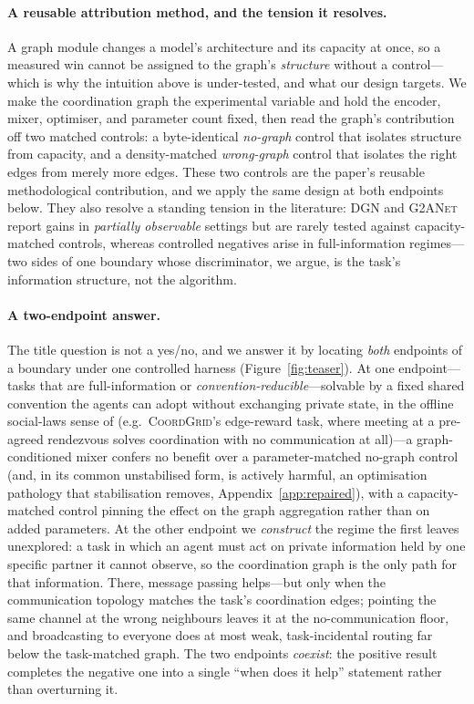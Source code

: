 \documentclass[10pt]{article}
\newcommand{\algoname}[1]{\textsc{#1}}
\newcommand{\coordgrid}{\textsc{CoordGrid}}
\begin{document}
\paragraph{A reusable attribution method, and the tension it resolves.} A graph
module changes a model's architecture and its capacity at once, so a measured
win cannot be assigned to the graph's \emph{structure} without a control---which
is why the intuition above is under-tested, and what our design targets. We make
the coordination graph the experimental variable and hold the encoder, mixer,
optimiser, and parameter count fixed, then read the graph's contribution off two
matched controls: a byte-identical \emph{no-graph} control that isolates
structure from capacity, and a density-matched \emph{wrong-graph} control that
isolates the right edges from merely more edges. These two controls are the
paper's reusable methodological contribution, and we apply the same design at
both endpoints below. They also resolve a standing tension in the literature:
\algoname{DGN} and \algoname{G2ANet} report gains in \emph{partially observable}
settings but are rarely tested against capacity-matched controls, whereas
controlled negatives arise in full-information regimes---two sides of one
boundary whose discriminator, we argue, is the task's information structure, not
the algorithm.

\paragraph{A two-endpoint answer.} The title question is not a yes/no, and we
answer it by locating \emph{both} endpoints of a boundary under one
controlled harness (Figure~\ref{fig:teaser}). At one endpoint---tasks that
are full-information or
\emph{convention-reducible}---solvable by a fixed shared
convention the agents can adopt without exchanging private state, in the
offline social-laws sense of \citet{shoham_1995_sociallaws} (e.g.\
\coordgrid's edge-reward task, where meeting at a pre-agreed rendezvous
solves coordination with no communication at all)---a graph-conditioned
mixer confers no benefit over a parameter-matched no-graph control (and, in
its common unstabilised form, is actively harmful, an optimisation pathology
that stabilisation removes, Appendix~\ref{app:repaired}), with a
capacity-matched control pinning the effect on the graph
aggregation rather than on added parameters. At the other endpoint we
\emph{construct} the regime the first leaves unexplored: a task in which an
agent must act on private information held by one specific partner it cannot
observe, so the coordination graph is the only path for that information.
There, message passing helps---but only when the communication topology
matches the task's coordination edges; pointing the same channel at the
wrong neighbours leaves it at the no-communication floor, and broadcasting to
everyone does at most weak, task-incidental routing far below the task-matched
graph. The two
endpoints \emph{coexist}: the positive result completes the negative one
into a single ``when does it help'' statement rather than overturning it.
\end{document}

